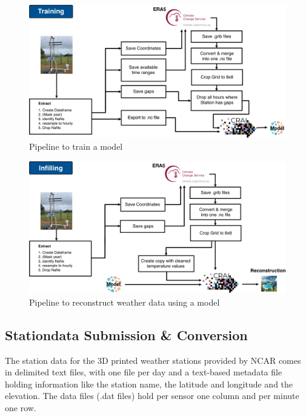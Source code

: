 \begin{figure}
    \centering
    \includegraphics[width=450pt]{resources/images/training_pipeline.png}
    \caption{Pipeline to train a model}
    \label{fig:training_pipeline}
\end{figure}

\begin{figure}
    \centering
    \includegraphics[width=450pt]{resources/images/infilling_pipeline.png}
    \caption{Pipeline to reconstruct weather data using a model}
    \label{fig:infilling_pipeline}
\end{figure}

\subsection{Stationdata Submission \& Conversion}

The station data for the 3D printed weather stations provided by NCAR comes in delimited text files, with one file per day and a text-based metadata file holding information like the station name, the latitude and longitude and the elevation.
The data files (.dat files) hold per sensor one column and per minute one row.

